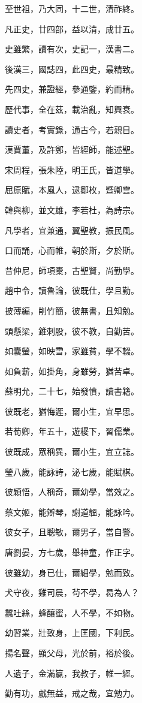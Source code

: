 \documentclass[12pt,a4paper]{ctexbook}
\begin{document}
至世祖，乃大同，十二世，清祚終。\par
凡正史，廿四部，益以清，成廿五。\par
史雖繁，讀有次，史記一，漢書二。\par
後漢三，國誌四，此四史，最精致。\par
先四史，兼證經，參通鑒，約而精。\par
歷代事，全在茲，載治亂，知興衰。\par
讀史者，考實錄，通古今，若親目。\par
漢賈董，及許鄭，皆經師，能述聖。\par
宋周程，張朱陸，明王氏，皆道學。\par
屈原賦，本風人，逮鄒枚，暨卿雲。\par
韓與柳，並文雄，李若杜，為詩宗。\par
凡學者，宜兼通，翼聖教，振民風。\par
口而誦，心而帷，朝於斯，夕於斯。\par
昔仲尼，師項橐，古聖賢，尚勤學。\par
趙中令，讀魯論，彼既仕，學且勤。\par
披薄編，削竹簡，彼無書，且知勉。\par
頭懸梁，錐刺股，彼不教，自勤苦。\par
如囊螢，如映雪，家雖貧，學不輟。\par
如負薪，如掛角，身雖勞，猶苦卓。\par
蘇明允，二十七，始發憤，讀書籍。\par
彼既老，猶悔遲，爾小生，宜早思。\par
若荀卿，年五十，遊稷下，習儒業。\par
彼既成，眾稱異，爾小生，宜立誌。\par
瑩八歲，能詠詩，泌七歲，能賦棋。\par
彼穎悟，人稱奇，爾幼學，當效之。\par
蔡文姬，能辯琴，謝道韞，能詠吟。\par
彼女子，且聰敏，爾男子，當自警。\par
唐劉晏，方七歲，舉神童，作正字。\par
彼雖幼，身已仕，爾細學，勉而致。\par
犬守夜，雞司晨，茍不學，曷為人？\par
蠶吐絲，蜂釀蜜，人不學，不如物。\par
幼習業，壯致身，上匡國，下利民。\par
揚名聲，顯父母，光於前，裕於後。\par
人遺子，金滿籯，我教子，帷一經。\par
勤有功，戲無益，戒之哉，宜勉力。\par
\end{document}
